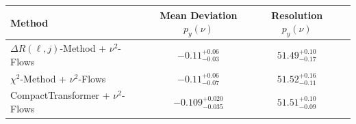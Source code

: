     \begin{tabular}{lccc}
        \toprule
        Method & Mean Deviation $p_{y}(\nu)$ & Resolution $p_{y}(\nu)$ \\
        \midrule
        $\Delta R(\ell,j)$-Method + $\nu^2$-Flows & $-0.11^{+0.06}_{-0.03}$ & $51.49^{+0.10}_{-0.17}$ \\
        $\chi^2$-Method + $\nu^2$-Flows & $-0.11^{+0.06}_{-0.07}$ & $51.52^{+0.16}_{-0.11}$ \\
        CompactTransformer + $\nu^2$-Flows & $-0.109^{+0.020}_{-0.035}$ & $51.51^{+0.10}_{-0.09}$ \\
        \bottomrule
    \end{tabular}